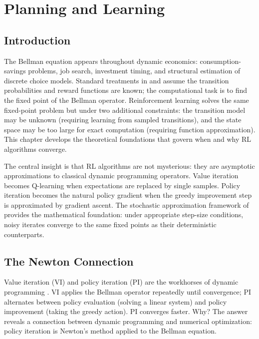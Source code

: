 
\section{Planning and Learning}
\label{sec:planning_learning}

\subsection{Introduction}
\label{sec:ch2_intro}

The Bellman equation appears throughout dynamic economics: consumption-savings problems, job search, investment timing, and structural estimation of discrete choice models. Standard treatments in \citet{StokeyLucas1989} and \citet{Rust1987} assume the transition probabilities and reward functions are known; the computational task is to find the fixed point of the Bellman operator. Reinforcement learning solves the same fixed-point problem but under two additional constraints: the transition model may be unknown (requiring learning from sampled transitions), and the state space may be too large for exact computation (requiring function approximation). This chapter develops the theoretical foundations that govern when and why RL algorithms converge.

The central insight is that RL algorithms are not mysterious: they are asymptotic approximations to classical dynamic programming operators. Value iteration becomes Q-learning when expectations are replaced by single samples. Policy iteration becomes the natural policy gradient when the greedy improvement step is approximated by gradient ascent. The stochastic approximation framework of \citet{Robbins1952} provides the mathematical foundation: under appropriate step-size conditions, noisy iterates converge to the same fixed points as their deterministic counterparts.


\subsection{The Newton Connection}
\label{sec:newton_connection}

Value iteration (VI) and policy iteration (PI) are the workhorses of dynamic programming \citep{StokeyLucas1989}. VI applies the Bellman operator repeatedly until convergence; PI alternates between policy evaluation (solving a linear system) and policy improvement (taking the greedy action). PI converges faster. Why? The answer reveals a connection between dynamic programming and numerical optimization: policy iteration is Newton's method applied to the Bellman equation.

